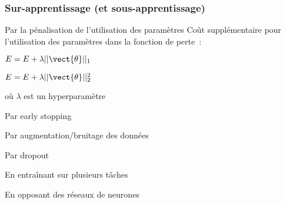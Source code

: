 \begin{frame}
  \frametitle{Sur-apprentissage (et sous-apprentissage)}
\end{frame}

\begin{frame}{Par la pénalisation de l'utilisation des paramètres}
  Coût supplémentaire pour l'utilisation des paramètres dans la fonction de perte~:
  \begin{description}[<+->]
    \item[L1] $E = E + \lambda ||\vect{\theta}||_1$
    \item[L2] $E = E + \lambda ||\vect{\theta}||_2^2$
  \end{description}

  où $\lambda$ est un hyperparamètre
\end{frame}

\begin{frame}{Par early stopping}
\end{frame}

\begin{frame}{Par augmentation/bruitage des données}
\end{frame}

\begin{frame}{Par dropout}
\end{frame}

\begin{frame}{En entraînant sur plusieurs tâches}
\end{frame}

\begin{frame}{En opposant des réseaux de neurones}
\end{frame}
